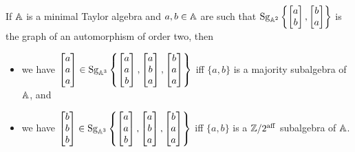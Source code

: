 \documentclass[letterpaper,11pt]{article}
\DeclareMathOperator{\Sg}{Sg}
\DeclareMathOperator{\aff}{aff}
\begin{document}
\begin{prop} If $\mathbb{A}$ is a minimal Taylor algebra and $a, b \in \mathbb{A}$ are such that $\Sg_{\bA^2}\left\{\begin{bmatrix} a\\ b\end{bmatrix}, \begin{bmatrix} b\\ a\end{bmatrix}\right\}$ is the graph of an automorphism of order two, then
\begin{itemize}
\item we have $\begin{bmatrix} a\\ a\\ a\end{bmatrix} \in \Sg_{\bA^3}\left\{\begin{bmatrix} a\\ a\\ b\end{bmatrix}, \begin{bmatrix} a\\ b\\ a\end{bmatrix}, \begin{bmatrix} b\\ a\\ a\end{bmatrix}\right\}$ iff $\{a,b\}$ is a majority subalgebra of $\mathbb{A}$, and
\item we have $\begin{bmatrix} b\\ b\\ b\end{bmatrix} \in \Sg_{\bA^3}\left\{\begin{bmatrix} a\\ a\\ b\end{bmatrix}, \begin{bmatrix} a\\ b\\ a\end{bmatrix}, \begin{bmatrix} b\\ a\\ a\end{bmatrix}\right\}$ iff $\{a,b\}$ is a $\ZZ/2^{\aff}$ subalgebra of $\mathbb{A}$.
\end{itemize}
\end{prop}
\end{document}
